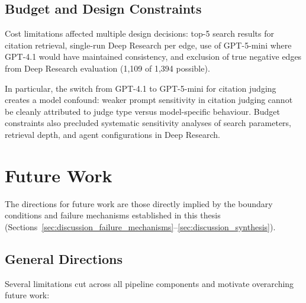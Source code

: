 \subsection{Budget and Design Constraints}

Cost limitations affected multiple design decisions: top-5 search results for citation retrieval, single-run Deep Research per edge, use of GPT-5-mini where GPT-4.1 would have maintained consistency, and exclusion of true negative edges from Deep Research evaluation (1,109 of 1,394 possible).

In particular, the switch from GPT-4.1 to GPT-5-mini for citation judging creates a model confound: weaker prompt sensitivity in citation judging cannot be cleanly attributed to judge type versus model-specific behaviour. Budget constraints also precluded systematic sensitivity analyses of search parameters, retrieval depth, and agent configurations in Deep Research.

\section{Future Work}
\label{sec:discussion_future}

\noindent
The directions for future work are those directly implied by the boundary conditions and failure mechanisms established in this thesis (Sections~\ref{sec:discussion_failure_mechanisms}--\ref{sec:discussion_synthesis}).

\subsection{General Directions}

Several limitations cut across all pipeline components and motivate overarching future work:

